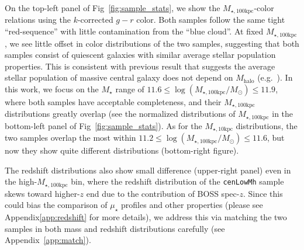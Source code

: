 \documentclass[a4paper,fleqn,usenatbib]{mnras}
\def\nbcg{\texttt{cenLowMh}}
\def\mstar{{$M_{\star}$}}
\def\mhalo{{$M_{\mathrm{halo}}$}}
\def\minn{{$M_{\star,10\mathrm{kpc}}$}}
\def\mtot{{$M_{\star,100\mathrm{kpc}}$}}
\def\logmtot{{$\log (M_{\star,100\mathrm{kpc}}/M_{\odot})$}}
\def\mden{{$\mu_{\star}$}}
\begin{document}
    On the top-left panel of Fig~\ref{fig:sample_stats}, we show the \mtot{}-color 
    relations using the $k$-corrected $g-r$ color. 
    Both samples follow the same tight ``red-sequence'' with little contamination 
    from the ``blue cloud''.
    At fixed \mtot{}, we see little offset in color distributions of the two 
    samples, suggesting that both samples consist of quiescent galaxies with 
    similar average stellar population properties.  
    This is consistent with previous result that suggests the average stellar 
    population of massive central galaxy does not depend on \mhalo{} 
    (e.g.\ \citealt{Park2007}).  
    In this work, we focus on the \mstar{} range of $11.6 \le$\logmtot{}$\le 11.9$, 
    where both samples have acceptable completeness, and their \mtot{} distributions 
    greatly overlap (see the normalized distributions of \mtot{} in the bottom-left 
    panel of Fig~\ref{fig:sample_stats}). 
    As for the \minn{} distributions, the two samples overlap the most within 
    $11.2 \le$\logmtot{}$\le 11.6$, but now they show quite different
    distributions (bottom-right figure).
    
    The redshift distributions also show small difference
    (upper-right panel) even in the high-\mtot{} bin, where the redshift distribution 
    of the \nbcg{} sample skews toward higher-$z$ end due to the contribution of BOSS 
    spec-$z$.
    Since this could bias the comparison of \mden{} profiles and other properties 
    (please see Appendix\ref{app:redshift} for more details), we address this via matching 
    the two samples in both mass and redshift distributions carefully
    (see Appendix~\ref{app:match}).
    
\end{document}

